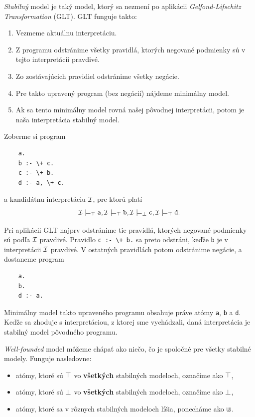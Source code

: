 \vline

\textit{Stabilný} model je taký model, ktorý sa nezmení po aplikácii \textit{Gelfond-Lifschitz
Transformation} (GLT). GLT funguje takto:
\begin{enumerate}
\item Vezmeme aktuálnu interpretáciu.
\item Z programu odstránime všetky pravidlá, ktorých negované podmienky sú v tejto interpretácii
pravdivé.
\item Zo zostávajúcich pravidiel odstránime všetky negácie.
\item Pre takto upravený program (bez negácií) nájdeme minimálny model.
\item Ak sa tento minimálny model rovná našej pôvodnej interpretácii, potom je naša interpretácia
stabilný model.
\end{enumerate}

Zoberme si program
\begin{verbatim}
    a.
    b :- \+ c.
    c :- \+ b.
    d :- a, \+ c.
\end{verbatim}

a kandidátnu interpretáciu $\mathcal{I}$, pre ktorú platí
$$\inter \models_\true \verb|a|, \inter \models_\true \verb|b|, \inter \models_\false \verb|c|,
\inter \models_\true \verb|d|\text{.}$$

Pri aplikácii GLT najprv odstránime tie pravidlá, ktorých negované podmienky sú podľa $\mathcal{I}$
pravdivé. Pravidlo \verb|c :- \+ b.| sa preto odstráni, keďže \verb|b| je v interpretácii $\mathcal{I}$
pravdivé. V ostatných pravidlách potom odstránime negácie, a dostaneme program
\begin{verbatim}
    a.
    b.
    d :- a.
\end{verbatim}

Minimálny model takto upraveného programu obsahuje práve atómy \verb|a|, \verb|b| a \verb|d|. Keďže
sa zhoduje s interpretáciou, z ktorej sme vychádzali, daná interpretácia je stabilný model pôvodného
programu.

\vline

\textit{Well-founded} model môžeme chápať ako niečo, čo je spoločné pre všetky stabilné modely.
Funguje nasledovne:
\begin{itemize}
\item atómy, ktoré sú $\top$ vo \textbf{všetkých} stabilných modeloch, označíme ako $\top$,
\item atómy, ktoré sú $\bot$ vo \textbf{všetkých} stabilných modeloch, označíme ako $\bot$,
\item atómy, ktoré sa v rôznych stabilných modeloch líšia, ponecháme ako $\Cup$.
\end{itemize}

